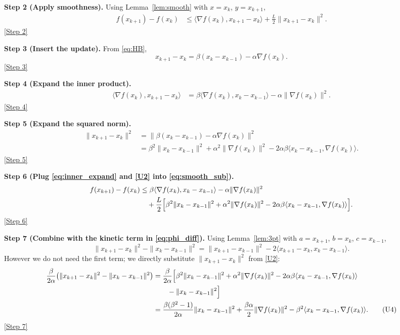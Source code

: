 \documentclass[11pt]{article}
\begin{document}
\medskip
\noindent\textbf{Step 2 (Apply smoothness).}  
Using Lemma~\ref{lem:smooth} with $x=x_{k}$, $y=x_{k+1}$,
\begin{align}
f(x_{k+1})-f(x_{k})
&\le \langle\nabla f(x_{k}),x_{k+1}-x_{k}\rangle
   +\frac{L}{2}\|x_{k+1}-x_{k}\|^{2}. \label{eq:smooth_sub}
\end{align}
\underline{[Step 2]}

\medskip
\noindent\textbf{Step 3 (Insert the update).}  
From \eqref{eq:HB},
\[
x_{k+1}-x_{k}= \beta(x_{k}-x_{k-1})-\alpha\nabla f(x_{k}).
\tag{U1}
\]
\underline{[Step 3]}

\medskip
\noindent\textbf{Step 4 (Expand the inner product).}
\begin{align}
\langle\nabla f(x_{k}),x_{k+1}-x_{k}\rangle
&= \beta\langle\nabla f(x_{k}),x_{k}-x_{k-1}\rangle
   -\alpha\|\nabla f(x_{k})\|^{2}. \label{eq:inner_expand}
\end{align}
\underline{[Step 4]}

\medskip
\noindent\textbf{Step 5 (Expand the squared norm).}
\begin{align}
\|x_{k+1}-x_{k}\|^{2}
&= \|\beta(x_{k}-x_{k-1})-\alpha\nabla f(x_{k})\|^{2}\nonumber\\
&= \beta^{2}\|x_{k}-x_{k-1}\|^{2}
   +\alpha^{2}\|\nabla f(x_{k})\|^{2}
   -2\alpha\beta\langle x_{k}-x_{k-1},\nabla f(x_{k})\rangle.
\tag{U2}
\end{align}
\underline{[Step 5]}

\medskip
\noindent\textbf{Step 6 (Plug \eqref{eq:inner_expand} and \eqref{U2} into \eqref{eq:smooth_sub}).}
\begin{align}
f(x_{k+1})-f(x_{k})
&\le \beta\langle\nabla f(x_{k}),x_{k}-x_{k-1}\rangle
   -\alpha\|\nabla f(x_{k})\|^{2} \nonumber\\
&\quad+\frac{L}{2}\Bigl[
   \beta^{2}\|x_{k}-x_{k-1}\|^{2}
   +\alpha^{2}\|\nabla f(x_{k})\|^{2}
   -2\alpha\beta\langle x_{k}-x_{k-1},\nabla f(x_{k})\rangle
   \Bigr]. \label{eq:fsplit}
\end{align}
\underline{[Step 6]}

\medskip
\noindent\textbf{Step 7 (Combine with the kinetic term in \eqref{eq:phi_diff}).}
Using Lemma~\ref{lem:3pt} with $a=x_{k+1}$, $b=x_{k}$, $c=x_{k-1}$,
\[
\|x_{k+1}-x_{k}\|^{2}-\|x_{k}-x_{k-1}\|^{2}
 =\|x_{k+1}-x_{k-1}\|^{2}
   -2\langle x_{k+1}-x_{k},x_{k}-x_{k-1}\rangle .
\tag{U3}
\]
However we do not need the first term; we directly substitute
$\|x_{k+1}-x_{k}\|^{2}$ from \eqref{U2}:
\begin{align}
\frac{\beta}{2\alpha}
\bigl(\|x_{k+1}-x_{k}\|^{2}-\|x_{k}-x_{k-1}\|^{2}\bigr)
&= \frac{\beta}{2\alpha}\Bigl[
    \beta^{2}\|x_{k}-x_{k-1}\|^{2}
   +\alpha^{2}\|\nabla f(x_{k})\|^{2}
   -2\alpha\beta\langle x_{k}-x_{k-1},\nabla f(x_{k})\rangle \nonumber\\
&\qquad -\|x_{k}-x_{k-1}\|^{2}\Bigr] \nonumber\\
&= \frac{\beta(\beta^{2}-1)}{2\alpha}\|x_{k}-x_{k-1}\|^{2}
   +\frac{\beta\alpha}{2}\|\nabla f(x_{k})\|^{2}
   -\beta^{2}\langle x_{k}-x_{k-1},\nabla f(x_{k})\rangle .
\tag{U4}
\end{align}
\underline{[Step 7]}
\end{document}

